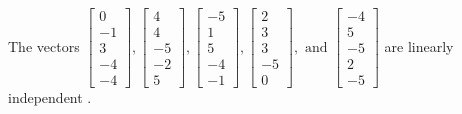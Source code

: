 \begin{exercise}
\begin{exerciseStatement}
  \end{exerciseStatement}
  \begin{exerciseAnswer}
   The vectors \(\left[\begin{array}{r}
0 \\
-1 \\
3 \\
-4 \\
-4
\end{array}\right] , \left[\begin{array}{r}
4 \\
4 \\
-5 \\
-2 \\
5
\end{array}\right] , \left[\begin{array}{r}
-5 \\
1 \\
5 \\
-4 \\
-1
\end{array}\right] , \left[\begin{array}{r}
2 \\
3 \\
3 \\
-5 \\
0
\end{array}\right] , \text{ and } \left[\begin{array}{r}
-4 \\
5 \\
-5 \\
2 \\
-5
\end{array}\right]\) are 
  	 linearly independent  .
  


  \end{exerciseAnswer}
\end{exercise}